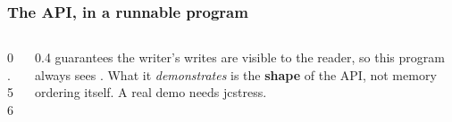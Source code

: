 \documentclass[aspectratio=169,10pt,compress]{beamer}
\begin{document}
\begin{frame}[t,fragile] \frametitle{The API, in a runnable program}
  \begin{columns}[T]
    \begin{column}{0.56\textwidth}
    \end{column}
    \begin{column}{0.4\textwidth}
      \small
       guarantees the writer's writes are visible to the
      reader, so this program always sees . What it
      \emph{demonstrates} is the \textbf{shape} of the API, not
      memory ordering itself. A real demo needs jcstress.
    \end{column}
  \end{columns}
\end{frame}
\end{document}
